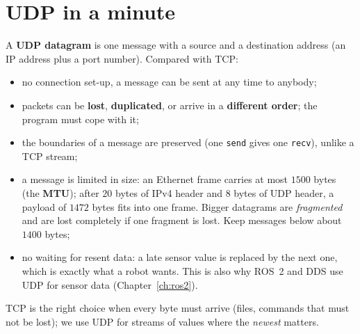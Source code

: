 \section*{UDP in a minute}
\begin{center}
\end{center}
A \textbf{UDP datagram} is one message with a source and a destination address (an IP address plus a port number). Compared with TCP:
\begin{itemize}[nosep]
\item no connection set-up, a message can be sent at any time to anybody;
\item packets can be \textbf{lost}, \textbf{duplicated}, or arrive in a \textbf{different order}; the program must cope with it;
\item the boundaries of a message are preserved (one \verb!send! gives one \verb!recv!), unlike a TCP stream;
\item a message is limited in size: an Ethernet frame carries at most $1500$ bytes (the \textbf{MTU}); after $20$ bytes of IPv4 header and $8$ bytes of UDP header, a payload of $1472$ bytes fits into one frame. Bigger datagrams are \emph{fragmented} and are lost completely if one fragment is lost. Keep messages below about $1400$ bytes;
\item no waiting for resent data: a late sensor value is replaced by the next one, which is exactly what a robot wants. This is also why ROS~2 and DDS use UDP for sensor data (Chapter~\ref{ch:ros2}).
\end{itemize}
TCP is the right choice when every byte must arrive (files, commands that must not be lost); we use UDP for streams of values where the \emph{newest} matters.

